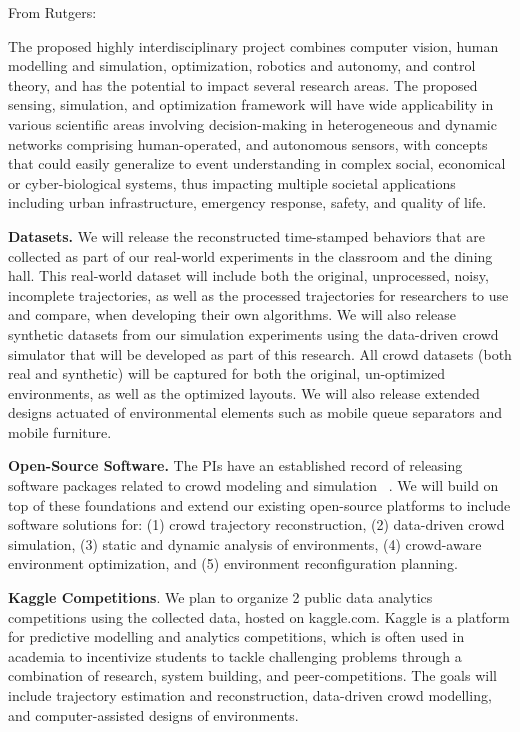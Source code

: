 From Rutgers:

The proposed highly interdisciplinary project combines computer vision, human modelling and simulation, optimization, robotics and autonomy, and control theory, and has the potential to impact several research areas. The proposed sensing, simulation, and optimization framework will have wide applicability in various scientific areas involving decision-making in heterogeneous and dynamic networks comprising human-operated, and autonomous sensors, with concepts that could easily generalize to event understanding in complex social, economical or cyber-biological systems, thus impacting multiple societal applications including urban infrastructure, emergency response, safety, and quality of life.

\noindent \textbf{Datasets.} We will release the reconstructed time-stamped behaviors that are collected as part of our real-world experiments in the classroom and the dining hall. This real-world dataset will include both the original, unprocessed, noisy, incomplete trajectories, as well as the processed trajectories for researchers to use and compare, when developing their own algorithms. We will also release synthetic datasets from our simulation experiments using the data-driven crowd simulator that will be developed as part of this research. All crowd datasets (both real and synthetic) will be captured for both the original, un-optimized environments, as well as the optimized layouts. We will also release extended designs actuated of environmental elements such as mobile queue separators and mobile furniture.

\noindent \textbf{Open-Source Software.} The PIs have an established record of releasing software packages related to crowd modeling and simulation ~\cite{steersuite,10.1109/TVCG.2014.251}. We will build on top of these foundations and extend our existing open-source platforms to include software solutions for: (1) crowd trajectory reconstruction, (2) data-driven crowd simulation, (3) static and dynamic analysis of environments, (4) crowd-aware environment optimization, and (5) environment reconfiguration planning.

\noindent \textbf{Kaggle Competitions}. We plan to organize 2 public data analytics competitions using the collected data, hosted on kaggle.com. Kaggle is a platform for predictive modelling and analytics competitions, which is often used in academia to incentivize students to tackle challenging problems through a combination of research, system building, and peer-competitions. The goals will include trajectory estimation and reconstruction, data-driven crowd modelling, and computer-assisted designs of environments.

